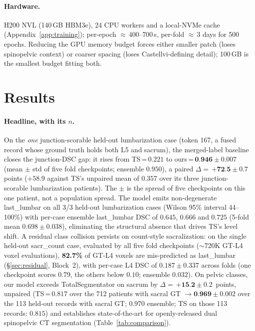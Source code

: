\documentclass{article}
\newcommand{\TS}{TotalSegmentator}
\newcommand{\sota}{TS}
\begin{document}
\paragraph{Hardware.}
H200 NVL (140\,GB HBM3e), 24 CPU workers and a local-NVMe
cache (Appendix~\ref{app:training}); per-epoch
${\approx}\,400$--$700$\,s, per-fold ${\approx}\,3$ days
for 500 epochs. Reducing the GPU memory
budget forces either smaller patch (loses spinopelvic
context) or coarser spacing (loses Castellvi-defining
detail); 100\,GB is the smallest budget fitting both.

\section{Results}
\label{sec:results}

\paragraph{Headline, with its $n$.}
On the \emph{one} junction-scorable held-out
lumbarization case (token 167, a fused record whose
ground truth holds both L5 and sacrum), the merged-label
baseline closes the junction-DSC gap: it rises from \sota{}\,=\,$0.221$ to
ours\,=\,$\textbf{0.946} \pm 0.007$ (mean $\pm$ std of
five fold checkpoints; ensemble $0.950$), a paired
$\Delta{=}\,\textbf{+72.5} \pm 0.7$ points ($+58.9$
against \sota{}'s unpaired mean of $0.357$ over its three
junction-scorable lumbarization patients). The $\pm$ is
the spread of five checkpoints on this one patient, not a
population spread. The model emits non-degenerate last\_lumbar on all 3/3
held-out lumbarization cases (Wilson 95\% interval
44--100\%) with per-case ensemble last\_lumbar DSC of
$0.645$, $0.666$ and $0.725$ (5-fold mean $0.698 \pm
0.038$), eliminating the structural absence that drives
\sota{}'s level shift. A residual class collision persists
on count-style sacralization: on the single held-out
sacr\_count case, evaluated by all five fold checkpoints
(${\sim}720$K GT-L4 voxel evaluations), \textbf{82.7\%} of
GT-L4 voxels are mis-predicted as last\_lumbar
(\S\ref{sec:residual}, Block~2), with per-case L4 DSC of
$0.187 \pm 0.337$ across folds (one checkpoint scores
$0.79$, the others below $0.10$; ensemble $0.032$).
On pelvic classes, our model exceeds
\TS{} on sacrum by $\Delta{=}\,\textbf{+15.2} \pm
0.2$~points, unpaired (\sota{}\,=\,$0.817$ over the 712
patients with sacral GT $\to \textbf{0.969} \pm 0.002$
over the 113 held-out records with sacral GT; $0.970$
ensemble; \sota{} on those 113 records: $0.815$) and
establishes state-of-the-art for
openly-released dual spinopelvic CT segmentation
(Table~\ref{tab:comparison}).
\end{document}
